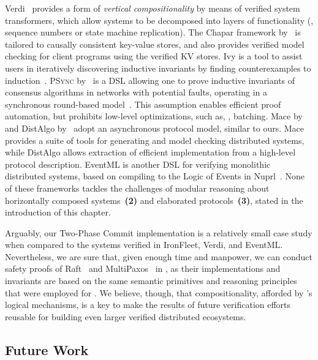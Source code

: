 Verdi~\cite{Wilcox-al:PLDI15, Woos-al:CPP16} provides a form of
\emph{vertical compositionality} by means of verified system
transformers, which allow systems to be decomposed into layers of
functionality (\eg, sequence numbers or state machine replication).
%
The Chapar framework by~\citet{Lesani-al:POPL16} is tailored to
causally consistent key-value stores, and also provides verified model
checking for client programs using the verified KV stores.
%
Ivy is a tool to assist users in iteratively discovering inductive
invariants by finding counterexamples to
induction~\cite{Padon-al:PLDI16}.
%
\textsc{PSync} by~\citet{Dragoi-al:POPL16} is a DSL allowing one to
prove inductive invariants of consensus algorithms in networks with
potential faults, operating in a synchronous round-based
model~\cite{Elrad-Frances:SCP82}. This assumption enables efficient
proof automation, but prohibits low-level optimizations, such as, \eg,
batching.
%
Mace by~\citet{killian:mace} and DistAlgo
by~\citet{Liu-al:OOPSLA12} adopt an asynchronous protocol model,
similar to ours.
%
Mace provides a suite of tools for generating and model checking
distributed systems, while DistAlgo allows extraction of efficient
implementation from a high-level protocol description.
%
EventML is another DSL for verifying monolithic distributed systems,
based on compiling to the Logic of Events in
Nuprl~\cite{rahli:eventml-avocs}.
%
None of these frameworks tackles the challenges of modular reasoning
about horizontally composed systems~\textbf{(2)} and elaborated
protocols~\textbf{(3)}, stated in the introduction of this chapter.

Arguably, our Two-Phase Commit implementation is a relatively small
case study when compared to the systems verified in IronFleet, Verdi,
and EventML. Nevertheless, we are sure that, given enough time and
manpower, we can conduct safety proofs of
Raft~\cite{ongaro:raft} and
MultiPaxos~\cite{vanRenesse-Altinbuken:ACS15} in \disel, as their
implementations and invariants are based on the same semantic
primitives and reasoning principles that were employed for .
%
We believe, though, that compositionality, afforded by \disel's
logical mechanisms, is a key to make the results of future
verification efforts reusable for building even larger verified
distributed ecosystems.

\subsection{Future Work}

